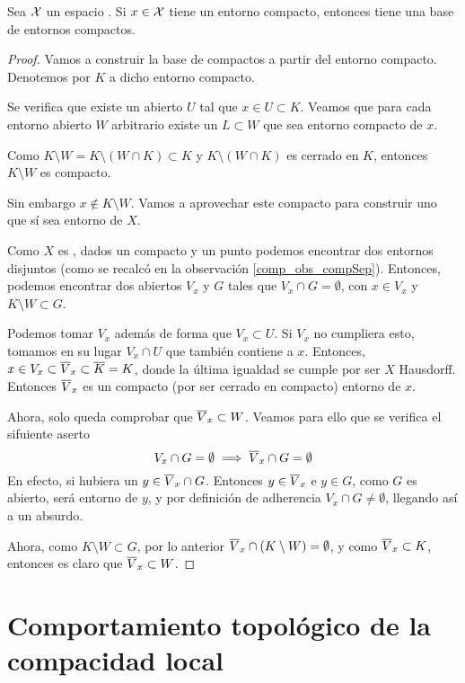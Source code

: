 \begin{prop}
	Sea $\mathcal{X}$ un espacio \hausdorff. Si $x\in \mathcal{X}$ tiene un entorno compacto, entonces tiene una base de entornos compactos.
\end{prop}
\begin{proof}
	Vamos a construir la base de compactos a partir del entorno compacto. Denotemos por $K$ a dicho entorno compacto.
	
	Se verifica que existe un abierto $U$ tal que $x\in U\subset K$. Veamos que para cada entorno abierto $W$ arbitrario existe un $L\subset W$ que sea entorno compacto de $x$.
	
	Como $K\setminus W=K\setminus (W\cap K)\subset K$ y $K\setminus (W\cap K)$ es cerrado en $K$, entonces $K\setminus W$ es compacto.
	
	Sin embargo $x\notin K\setminus W$. Vamos a aprovechar este compacto para construir uno que sí sea entorno de $X$.
	
	Como $X$ es \hausdorff, dados un compacto y un punto podemos encontrar dos entornos disjuntos (como se recalcó en la observación \ref{comp_obs_compSep}). Entonces, podemos encontrar dos abiertos $V_x$ y $G$ tales que $V_x\cap G=\emptyset$, con $x\in V_x$ y $K\setminus W\subset G$.
	
	Podemos tomar $V_x$ además de forma que $V_x\subset U$. Si $V_x$ no cumpliera esto, tomamos en su lugar $V_x\cap U$ que también contiene a $x$. Entonces, $x\in V_x\subset \overline{V}_x\subset \overline{K}=K$, donde la última igualdad se cumple por ser $X$ Hausdorff. Entonces $\overline{V}_x$ es un compacto (por ser cerrado en compacto) entorno de $x$.
	
	Ahora, solo queda comprobar que $\overline{V}_x\subset W$. Veamos para ello que se verifica el sifuiente aserto
	\[V_x\cap G=\emptyset\implies \overline{V}_x\cap G=\emptyset\]
	En efecto, si hubiera un $y\in \overline{V}_x\cap G$. Entonces $y\in\overline{V}_x$ e $y\in G$, como $G$ es abierto, será entorno de $y$, y por definición de adherencia $V_x \cap G\not=\emptyset$, llegando así a un absurdo.
	
	Ahora, como $K\setminus W\subset G$, por lo anterior $\overline{V}_x\cap (K\setminus W)=\emptyset$, y como $\overline{V}_x\subset K$, entonces es claro que $\overline{V}_x\subset W$.
\end{proof}

\section{Comportamiento topológico de la compacidad local}

